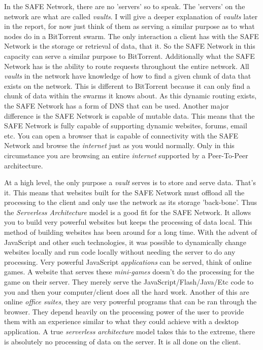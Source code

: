 \documentclass{l4proj}
\begin{document}
In the SAFE Network, there are no 'servers' so to speak. The 'servers' on the network are what are called \textit{vaults}. I will give a deeper explanation of \textit{vaults} later in the report, for now just think of them as serving a similar purpose as to what nodes do in a BitTorrent swarm.  The only interaction a client has with the SAFE Network is the storage or retrieval of data, that it. So the SAFE Network in this capacity can serve a similar purpose to BitTorrent. Additionally what the SAFE Network has is the ability to route requests throughout the entire network. All \textit{vaults} in the network have knowledge of how to find a given chunk of data that exists on the network. This is different to BitTorrent because it can only find a chunk of data within the swarms it knows about. As this dynamic routing exists, the SAFE Network has a form of DNS that can be used. Another major difference is the SAFE Network is capable of mutable data. This means that the SAFE Network is fully capable of supporting dynamic websites, forums, email etc. You can open a browser that is capable of connectivity with the SAFE Network and browse the \textit{internet} just as you would normally. Only in this circumstance you are browsing an entire \textit{internet} supported by a Peer-To-Peer architecture.

At a high level, the only purpose a \textit{vault} serves is to store and serve data. That's it. This means that websites built for the SAFE Network must offload all the processing to the client and only use the network as its storage 'back-bone'. Thus the \textit{Serverless Architecture} model is a good fit for the SAFE Network. It allows you to build very powerful websites but keeps the processing of data local. This method of building websites has been around for a long time. With the advent of JavaScript and other such technologies, it was possible to dynamically change websites locally and run code locally without needing the server to do any processing. Very powerful JavaScript \textit{applications} can be served, think of online games. A website that serves these \textit{mini-games} doesn't do the processing for the game on their server. They merely serve the JavaScript/Flash/Java/Etc code to you and then your computer/client does all the hard work. Another of this are online \textit{office suites}, they are very powerful programs that can be ran through the browser. They depend heavily on the processing power of the user to provide them with an experience similar to what they could achieve with a desktop application. A true \textit{serverless architecture} model takes this to the extreme, there is absolutely no processing of data on the server. It is all done on the client. 
\end{document}
